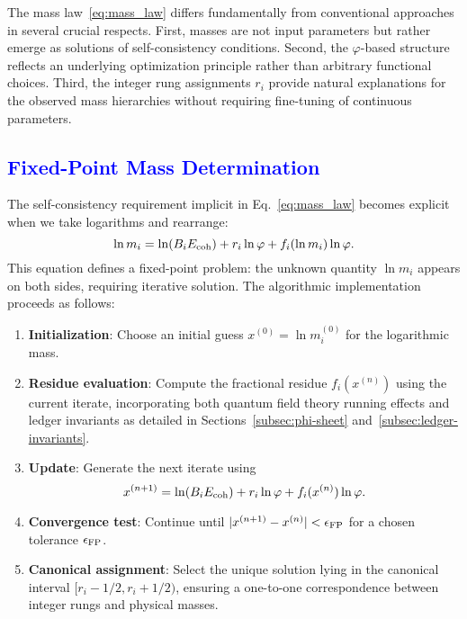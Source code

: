 \documentclass[%
amsmath,amssymb,
aps,
prb,
floatfix, showkeys, 10pt,
]{revtex4-2}
\newcommand{\modif}[1]{\textcolor{blue}{#1}}
\begin{document}
The mass law~\eqref{eq:mass_law} differs fundamentally from conventional approaches in several crucial respects. First, masses are not input parameters but rather emerge as solutions of self-consistency conditions. Second, the $\varphi$-based structure reflects an underlying optimization principle rather than arbitrary functional choices. Third, the integer rung assignments $r_i$ provide natural explanations for the observed mass hierarchies without requiring fine-tuning of continuous parameters.










{\modif{\subsection{Fixed-Point Mass Determination}
\label{subsec:fixed-point}  }}
The self-consistency requirement implicit in Eq.~\eqref{eq:mass_law} becomes explicit when we take logarithms and rearrange:
\begin{equation}
\ln m_i = \ln(B_i E_{\rm coh}) + r_i \ln \varphi + f_i(\ln m_i) \ln \varphi.
\label{eq:fixed_point_eq}
\end{equation}
This equation defines a fixed-point problem: the unknown quantity $\ln m_i$ appears on both sides, requiring iterative solution. The algorithmic implementation proceeds as follows:
\begin{enumerate}
\item \textbf{Initialization}: Choose an initial guess $x^{(0)} = \ln m_i^{(0)}$ for the logarithmic mass.

\item \textbf{Residue evaluation}: Compute the fractional residue $f_i(x^{(n)})$ using the current iterate, incorporating both quantum field theory running effects and ledger invariants as detailed in Sections~\ref{subsec:phi-sheet} and~\ref{subsec:ledger-invariants}.

\item \textbf{Update}: Generate the next iterate using
\begin{equation}
x^{(n+1)} = \ln(B_i E_{\rm coh}) + r_i \ln \varphi + f_i(x^{(n)}) \ln \varphi.
\label{eq:iteration}
\end{equation}

\item \textbf{Convergence test}: Continue until $|x^{(n+1)} - x^{(n)}| < \epsilon_{\rm FP}$ for a chosen tolerance $\epsilon_{\rm FP}$.

\item \textbf{Canonical assignment}: Select the unique solution lying in the canonical interval $[r_i - 1/2, r_i + 1/2)$, ensuring a one-to-one correspondence between integer rungs and physical masses.
\end{enumerate}
\end{document}
